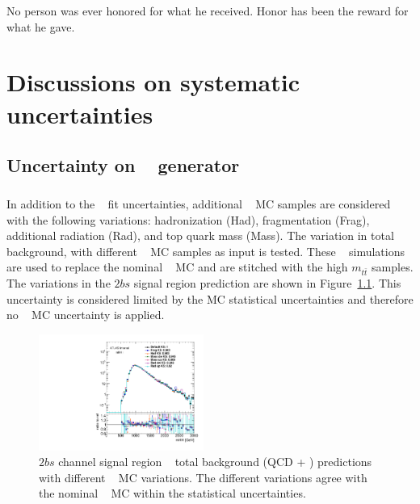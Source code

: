 \begin{savequote}[75mm]
No person was ever honored for what he received. Honor has been the reward for what he gave.   
\end{savequote}
\chapter{Discussions on systematic uncertainties}
\label{app:appendixSys}

\section{Uncertainty on \ttbar~ generator}
\label{sec:ttbar-mc-unc}

\paragraph{}
In addition to the \ttbar~ fit uncertainties, additional \ttbar~ MC samples are considered with the following variations: hadronization (Had), fragmentation (Frag), additional radiation (Rad), and top quark mass (Mass).
The variation in total background, with different \ttbar~ MC samples as input is tested.
These \ttbar~ simulations are used to replace the nominal \ttbar~ MC and are stitched with the high $m_{t\bar{t}}$ samples. 
The variations in the $2bs$ signal region prediction are shown in Figure~\ref{fig:ttbar-MC}. 
This uncertainty is considered limited by the MC statistical uncertainties and therefore no \ttbar~ MC uncertainty is applied.

\begin{figure}[htb!]
\begin{center} 
\includegraphics[width=0.48\textwidth,angle=-90]{figures/boosted/Other/directcompare_mHH_l_1_TwoTag_split_Top_syst_stat_postfit_all_.pdf}
\caption{$2bs$ channel signal region \mtwoJ~ total background (QCD + \ttbar) predictions with different \ttbar~ MC variations. The different variations agree with the nominal \ttbar~ MC within the statistical uncertainties.}
\label{fig:ttbar-MC}
\end{center}
\end{figure}

